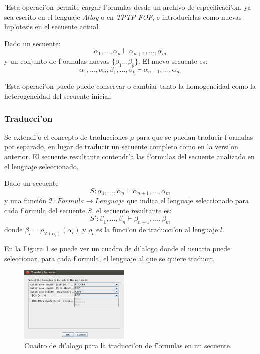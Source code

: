 'Esta operaci'on permite cargar f'ormulas desde un archivo de especificaci'on, ya sea escrito en el lenguaje \textit{Alloy} o en \textit{TPTP-FOF}, e introducirlas como nuevas hip'otesis en el secuente actual.

Dado un secuente:
$$ \alpha_1,\ldots,\alpha_n \vdash \alpha_{n+1},\ldots,\alpha_m $$
y un conjunto de f'ormulas nuevas $\{\beta_1 \ldots \beta_k\}$. El nuevo secuente es:
$$ \alpha_1,\ldots,\alpha_n,\beta_1,\ldots, \beta_k \vdash \alpha_{n+1},\ldots,\alpha_m $$

'Esta operaci'on puede puede conservar o cambiar tanto la homogeneidad como la heterogeneidad del secuente inicial.


\subsubsection{Traducci'on}

Se extendi'o el concepto de traducciones $\rho$ para que se puedan traducir f'ormulas por separado, en lugar de traducir un secuente completo como en la versi'on anterior.
El secuente resultante contendr'a las f'ormulas del secuente analizado en el lenguaje seleccionado.

Dado un secuente $$ S: \alpha_1,\ldots,\alpha_n \vdash \alpha_{n+1},\ldots,\alpha_m $$
y una función  $\mathcal{T}:Formula\rightarrow Lenguaje$ que indica el lenguaje seleccionado para cada f'ormula del secuente $S$, el secuente resultante es:
$$ S': \beta_1,\ldots,\beta_n \vdash \beta_{n+1},\ldots,\beta_m $$
donde $\beta_{i} = \rho_{\mathcal{T}(\alpha_i)}(\alpha_i)$ y $\rho_l$ es la funci'on de traducci'on al lenguaje $l$.

En la Figura \ref{GUI form translation} se puede ver un cuadro de di'alogo donde el usuario puede seleccionar, para cada f'ormula, el lenguaje al que se quiere traducir.

\begin{figure}[tb]
	\includegraphics[width=200px]{img/translate.png}
	\centering
	\caption{Cuadro de di'alogo para la traducci'on de f'ormulas en un secuente.} \label{GUI form translation}
\end{figure}


